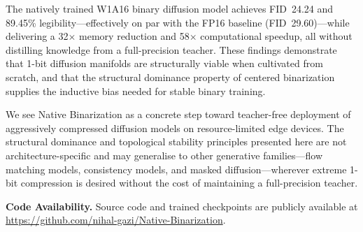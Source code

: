 \documentclass[twocolumn, journal]{IEEEtran}
\begin{document}
The natively trained W1A16 binary diffusion model achieves FID~24.24 and 89.45\%
legibility---effectively on par with the FP16 baseline (FID~29.60)---while delivering a
32$\times$ memory reduction and 58$\times$ computational speedup, all without
distilling knowledge from a full-precision teacher. These findings demonstrate that
1-bit diffusion manifolds are structurally viable when cultivated from scratch, and that
the structural dominance property of centered binarization supplies the inductive bias
needed for stable binary training.

We see Native Binarization as a concrete step toward teacher-free deployment of
aggressively compressed diffusion models on resource-limited edge devices. The structural
dominance and topological stability principles presented here are not architecture-specific
and may generalise to other generative families---flow matching models, consistency
models, and masked diffusion---wherever extreme 1-bit compression is desired without the
cost of maintaining a full-precision teacher.

\smallskip\noindent\textbf{Code Availability.} Source code and trained checkpoints are
publicly available at \url{https://github.com/nihal-gazi/Native-Binarization}.




\end{document}
